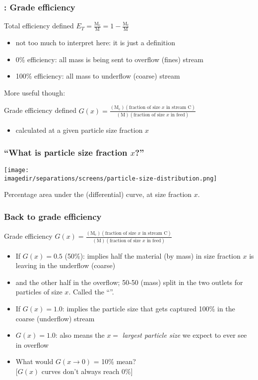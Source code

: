\begin{frame}\frametitle{{\color{myOrange}{Concept}}: Grade efficiency}
	\begin{exampleblock}{Total efficiency defined}
		$E_T = \displaystyle \frac{\text{M}_\text{c}}{\text{M}} = 1 - \displaystyle \frac{\text{M}_\text{f}}{\text{M}}$
	\end{exampleblock}
	\begin{itemize}
		\item	not too much to interpret here: it is just a definition
		\item	0\% efficiency: all mass is being sent to overflow (fines) stream
		\item	100\% efficiency: all mass to underflow (coarse) stream
	\end{itemize}
	\vspace{12pt}
	More useful though:
	\begin{exampleblock}{Grade efficiency defined}
		$G(x) = \displaystyle \frac{(\text{M}_\text{c})(\text{fraction of size $x$ in stream C})}{(\text{M})(\text{fraction of size $x$ in feed})}$
	\end{exampleblock}
	\begin{itemize}
		\item	calculated at a given particle size fraction $x$
	\end{itemize}
\end{frame}

\begin{frame}\frametitle{``What is particle size fraction $x$?''}
	\begin{center}
		\texttt{[image: \\imagedir/separations/screens/particle-size-distribution.png]}
	\end{center}
	Percentage area under the (differential) curve, at size fraction $x$.
\end{frame}

\begin{frame}\frametitle{Back to grade efficiency}
	\begin{exampleblock}{Grade efficiency}
		$G(x) = \displaystyle \frac{(\text{M}_\text{c})(\text{fraction of size $x$ in stream C})}{(\text{M})(\text{fraction of size $x$ in feed})}$
	\end{exampleblock}
	\begin{itemize}
		\item	If $G(x) = 0.5$ (50\%): implies half the material (by mass) in size fraction $x$ is leaving in the underflow (coarse)
		\item	and the other half in the overflow; 50-50 (mass) split in the two outlets for particles of size $x$. Called the ``{\color{purple}{cut size}}''.
		\item	If $G(x) = 1.0$: implies the particle size that gets captured 100\%  in the coarse (underflow) stream
		\item	$G(x) = 1.0$: also means the $x=$ \emph{largest particle size} we expect to ever see in overflow
		\item	\adv What would $G(x \rightarrow 0)$ = 10\% mean? \\{\scriptsize [$G(x)$ curves don't always reach 0\%]}
	\end{itemize}
\end{frame}

